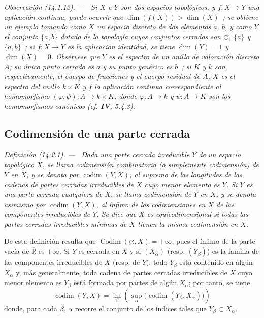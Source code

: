 \documentclass[10pt,oneside]{book}
\makeatletter
\newcommand{\setmanualcurrentlabel}[1]{\def\@currentlabel{#1}}
\newenvironment{definition}[1][]{%
  \setmanualcurrentlabel{#1}\par\medskip\noindent\itshape Definición (#1). ---\ }{\par}
\newenvironment{remark}[1][]{%
  \setmanualcurrentlabel{#1}\par\medskip\noindent\itshape Observación (#1). ---\ }{\par}
\makeatother
\begin{document}
\begin{remark}[14.1.12]
\label{0.14.1.12-es}
Si $X$ e $Y$ son dos espacios topológicos, y $f:X\to Y$ una aplicación
continua, puede ocurrir que $\dim(f(X))>\dim(X)$~; se obtiene un ejemplo tomando
como $X$ un espacio discreto de dos elementos $a$, $b$, y como $Y$ el conjunto
$\{a,b\}$ dotado de la topología cuyos conjuntos cerrados son
$\varnothing$, $\{a\}$ y $\{a,b\}$~; si $f:X\to Y$ es la aplicación
identidad, se tiene $\dim(Y)=1$ y $\dim(X)=0$. Obsérvese que $Y$ es el espectro
de un anillo de valoración discreta $A$; su único punto cerrado es $a$ y su
punto genérico es $b$~; si $K$ y $k$ son, respectivamente, el cuerpo de
fracciones y el cuerpo residual de $A$, $X$ es el espectro del anillo $k\times K$
y $f$ la aplicación continua correspondiente al homomorfismo
$(\varphi,\psi):A\to k\times K$, donde $\varphi:A\to k$ y $\psi:A\to K$ son
los homomorfismos canónicos (cf. \textbf{IV}, 5.4.3).
\end{remark}

\subsection{Codimensión de una parte cerrada}
\label{subsection:0.14.2-es}

\begin{definition}[14.2.1]
\label{0.14.2.1-es}
Dada una parte cerrada irreducible $Y$ de un espacio topológico $X$, se llama
codimensión combinatoria \textup{(o simplemente} codimensión) de $Y$ en
$X$, y se denota por $\operatorname{codim}(Y,X)$, al supremo de las longitudes
de las cadenas de partes cerradas irreducibles de $X$ cuyo menor elemento es
$Y$. Si $Y$ es una parte cerrada cualquiera de $X$, se llama
codimensión de $Y$ en $X$, y se denota asimismo por
$\operatorname{codim}(Y,X)$, al ínfimo de las codimensiones en $X$ de las
componentes irreducibles de $Y$. Se dice que $X$ es
equicodimensional si todas las partes cerradas irreducibles mínimas de
$X$ tienen la misma codimensión en $X$.
\end{definition}

De esta definición resulta que
$\operatorname{Codim}(\varnothing,X)=+\infty$, pues el ínfimo de la parte vacía
de $\overline{\mathbb R}$ es $+\infty$. Si $Y$ es cerrada en $X$ y si
$(X_\alpha)$ (resp. $(Y_\beta)$) es la familia de las componentes irreducibles
de $X$ (resp. de $Y$), todo $Y_\beta$ está contenido en algún $X_\alpha$ y,
más generalmente, toda cadena de partes cerradas irreducibles de $X$ cuyo menor
elemento es $Y_\beta$ está formada por partes de algún $X_\alpha$; por tanto,
se tiene
\[
  \operatorname{codim}(Y,X)=
  \inf_\beta\left(\sup_\alpha
  \bigl(\operatorname{codim}(Y_\beta,X_\alpha)\bigr)\right)
  \tag{14.2.1.1}\label{0.14.2.1.1-es}
\]
donde, para cada $\beta$, $\alpha$ recorre el conjunto de los índices tales que
$Y_\beta\subset X_\alpha$.
\end{document}
